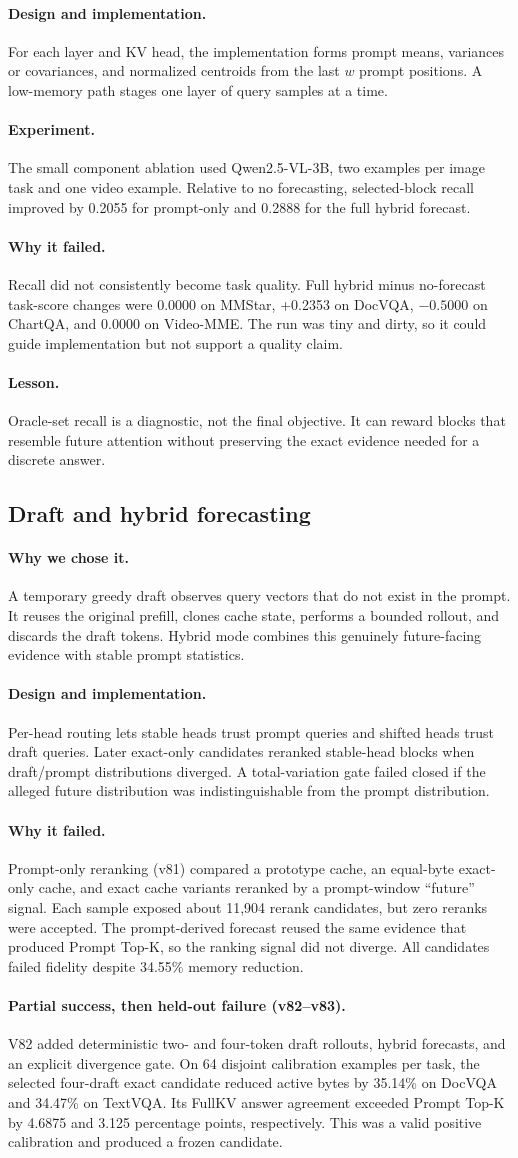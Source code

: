 \documentclass[11pt]{article}
\newcommand{\lesson}{\paragraph{Lesson.}}
\newcommand{\reason}{\paragraph{Why we chose it.}}
\newcommand{\design}{\paragraph{Design and implementation.}}
\newcommand{\experiment}{\paragraph{Experiment.}}
\newcommand{\failure}{\paragraph{Why it failed.}}
\begin{document}
\design
For each layer and KV head, the implementation forms prompt means, variances or covariances, and
normalized centroids from the last $w$ prompt positions.  A low-memory path stages one layer of
query samples at a time.

\experiment
The small component ablation used Qwen2.5-VL-3B, two examples per image task and one video example.
Relative to no forecasting, selected-block recall improved by 0.2055 for prompt-only and 0.2888 for
the full hybrid forecast.

\failure
Recall did not consistently become task quality.  Full hybrid minus no-forecast task-score changes
were 0.0000 on MMStar, +0.2353 on DocVQA, $-0.5000$ on ChartQA, and 0.0000 on Video-MME.  The run was
tiny and dirty, so it could guide implementation but not support a quality claim.

\lesson
Oracle-set recall is a diagnostic, not the final objective.  It can reward blocks that resemble
future attention without preserving the exact evidence needed for a discrete answer.

\subsection{Draft and hybrid forecasting}

\reason
A temporary greedy draft observes query vectors that do not exist in the prompt.  It reuses the
original prefill, clones cache state, performs a bounded rollout, and discards the draft tokens.
Hybrid mode combines this genuinely future-facing evidence with stable prompt statistics.

\design
Per-head routing lets stable heads trust prompt queries and shifted heads trust draft queries.
Later exact-only candidates reranked stable-head blocks when draft/prompt distributions diverged.
A total-variation gate failed closed if the alleged future distribution was indistinguishable from
the prompt distribution.

\failure
Prompt-only reranking (v81) compared a prototype cache, an equal-byte exact-only cache, and exact
cache variants reranked by a prompt-window ``future'' signal.
Each sample exposed about 11,904 rerank candidates, but zero
reranks were accepted.  The prompt-derived forecast reused the same evidence that produced Prompt
Top-K, so the ranking signal did not diverge.  All candidates failed fidelity despite 34.55\%
memory reduction.

\paragraph{Partial success, then held-out failure (v82--v83).}
V82 added deterministic two- and four-token draft rollouts, hybrid forecasts, and an explicit
divergence gate.  On 64 disjoint calibration examples per task, the selected four-draft exact
candidate reduced active bytes by 35.14\% on DocVQA and 34.47\% on TextVQA.  Its FullKV answer
agreement exceeded Prompt Top-K by 4.6875 and 3.125 percentage points, respectively.  This was a
valid positive calibration and produced a frozen candidate.
\end{document}
